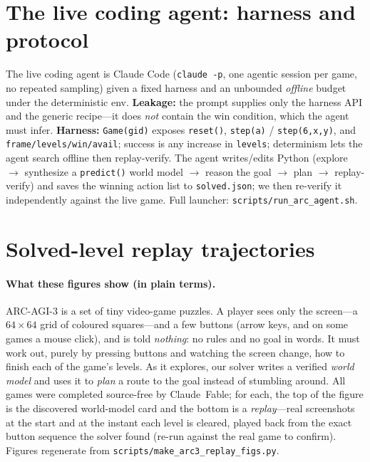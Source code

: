\documentclass[11pt]{article}
\begin{document}
\section{The live coding agent: harness and protocol}
\label{app:agent}
The live coding agent is Claude Code (\texttt{claude -p}, one agentic session per game, no repeated
sampling) given a fixed harness and an unbounded \emph{offline} budget under the deterministic env.
\textbf{Leakage:} the prompt supplies only the harness API and the generic recipe---it does \emph{not}
contain the win condition, which the agent must infer. \textbf{Harness:} \texttt{Game(gid)} exposes
\texttt{reset()}, \texttt{step(a)} / \texttt{step(6,x,y)}, and \texttt{frame/levels/win/avail};
success is any increase in \texttt{levels}; determinism lets the agent search offline then replay-verify.
The agent writes/edits Python (explore $\to$ synthesize a \texttt{predict()} world model $\to$ reason
the goal $\to$ plan $\to$ replay-verify) and saves the winning action list to \texttt{solved.json};
we then re-verify it independently against the live game. Full launcher: \texttt{scripts/run\_arc\_agent.sh}.

\section{Solved-level replay trajectories}
\label{app:replay}
\paragraph{What these figures show (in plain terms).} ARC-AGI-3 is a set of tiny video-game puzzles. A
player sees only the screen---a $64{\times}64$ grid of coloured squares---and a few buttons (arrow keys,
and on some games a mouse click), and is told \emph{nothing}: no rules and no goal in words. It must work
out, purely by pressing buttons and watching the screen change, how to finish each of the game's levels.
As it explores, our solver writes a verified \emph{world model} and uses it to \emph{plan} a route to the
goal instead of stumbling around. All \ArcFableFull{} games were completed source-free by Claude~Fable; for
each, the top of the figure is the discovered world-model card and the bottom is a \emph{replay}---real
screenshots at the start and at the instant each level is cleared, played back from the exact button
sequence the solver found (re-run against the real game to confirm). Figures regenerate from
\texttt{scripts/make\_arc3\_replay\_figs.py}.
\end{document}
